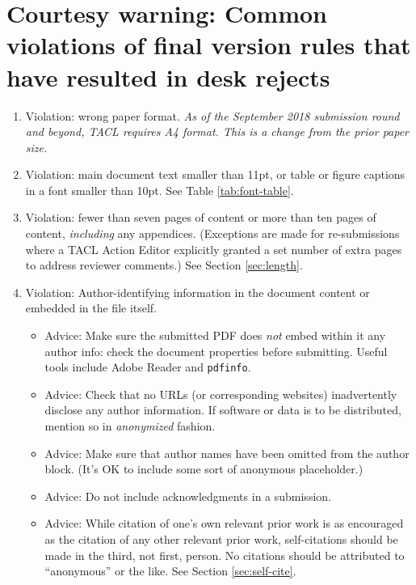 \documentclass[11pt,a4paper]{article}
\newcommand{\taclpaper}{final version\xspace}
\newcommand{\taclpaper}{submission\xspace}
\begin{document}
\section{Courtesy warning: Common violations of \taclpaper rules that have
resulted in desk
rejects}
\begin{enumerate}
  \item Violation: wrong paper format.
  \emph{As of the September 2018 submission round and beyond, TACL requires A4
  format.  This is a change from the prior paper size.}

  \item Violation: main document text smaller than 11pt, or table or figure
  captions in a font smaller than 10pt. See Table \ref{tab:font-table}.

  \item Violation: fewer than seven pages of content or more than ten pages of
  content, {\em including} any appendices. (Exceptions are made for
  re-submissions where a TACL Action Editor explicitly granted a set number of
  extra pages to address reviewer comments.) See
  Section \ref{sec:length}.
  \item Violation: Author-identifying information in the document content or
  embedded in the file itself.
    \begin{itemize}
      \item Advice: Make sure the submitted PDF does \emph{not} embed within it
      any author info: check the document properties before submitting.
      Useful tools include Adobe Reader and {\tt pdfinfo}.
      \item Advice: Check that no URLs (or corresponding websites) inadvertently
      disclose any author information. If software or data is to be distributed,
      mention so in {\em anonymized} fashion.
      \item Advice: Make sure that author names have been omitted
      from the author block. (It's OK to include some sort of anonymous
      placeholder.)
      \item Advice: Do not include acknowledgments in a submission.
      \item Advice: While citation of one's own relevant prior work is as
      encouraged as the citation of any other relevant prior work,
      self-citations should be made in the third, not first, person.
      No citations should be attributed to ``anonymous'' or the like.
      See Section \ref{sec:self-cite}.
    \end{itemize}
\end{enumerate}
\fi
\end{document}
